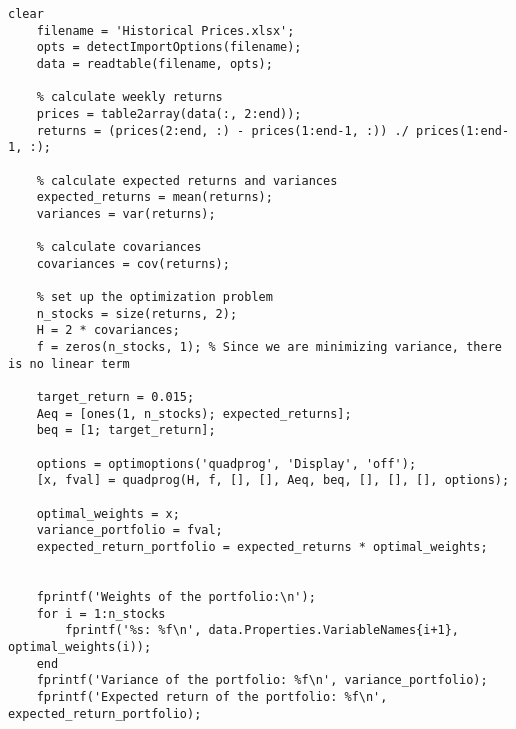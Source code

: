 \documentclass[12pt]{article}
\begin{document}
\begin{lstlisting}[label=lst:b,
    caption=Question b)]
    clear
    filename = 'Historical Prices.xlsx';
    opts = detectImportOptions(filename);
    data = readtable(filename, opts);
    
    % calculate weekly returns
    prices = table2array(data(:, 2:end));
    returns = (prices(2:end, :) - prices(1:end-1, :)) ./ prices(1:end-1, :);
    
    % calculate expected returns and variances
    expected_returns = mean(returns);
    variances = var(returns);
    
    % calculate covariances
    covariances = cov(returns);
    
    % set up the optimization problem
    n_stocks = size(returns, 2);
    H = 2 * covariances;
    f = zeros(n_stocks, 1); % Since we are minimizing variance, there is no linear term
    
    target_return = 0.015;
    Aeq = [ones(1, n_stocks); expected_returns];
    beq = [1; target_return];
    
    options = optimoptions('quadprog', 'Display', 'off');
    [x, fval] = quadprog(H, f, [], [], Aeq, beq, [], [], [], options);
    
    optimal_weights = x;
    variance_portfolio = fval;
    expected_return_portfolio = expected_returns * optimal_weights;
    
    
    fprintf('Weights of the portfolio:\n');
    for i = 1:n_stocks
        fprintf('%s: %f\n', data.Properties.VariableNames{i+1}, optimal_weights(i));
    end
    fprintf('Variance of the portfolio: %f\n', variance_portfolio);
    fprintf('Expected return of the portfolio: %f\n', expected_return_portfolio);
\end{lstlisting}
\end{document}
